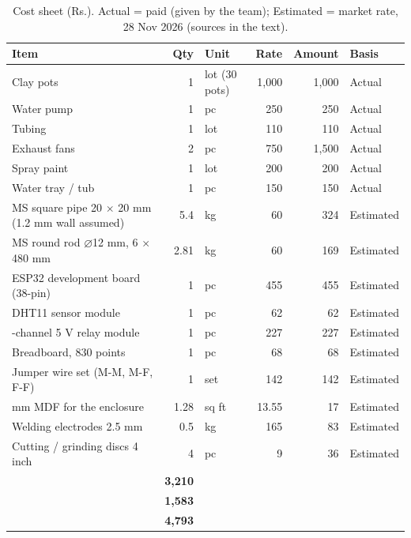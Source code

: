 \documentclass[11pt,a4paper]{report}
\begin{document}
\begin{table}[H]
\centering
\caption{Cost sheet (Rs.). Actual = paid (given by the team); Estimated = market rate, 28 Nov 2026 (sources in the text).}
\label{tab:cost}
\small
\begin{tabularx}{\linewidth}{@{}>{\raggedright\arraybackslash}Xrlrrl@{}}
\toprule
\textbf{Item} & \textbf{Qty} & \textbf{Unit} & \textbf{Rate} & \textbf{Amount} & \textbf{Basis} \\
\midrule
Clay pots & 1 & lot (30 pots) & 1,000 & 1{,}000 & Actual \\
Water pump & 1 & pc & 250 & 250 & Actual \\
Tubing & 1 & lot & 110 & 110 & Actual \\
Exhaust fans & 2 & pc & 750 & 1{,}500 & Actual \\
Spray paint & 1 & lot & 200 & 200 & Actual \\
Water tray / tub & 1 & pc & 150 & 150 & Actual \\
MS square pipe 20 $\times$ 20 mm (1.2 mm wall assumed) & 5.4 & kg & 60 & 324 & Estimated \\
MS round rod $\varnothing$12 mm, 6 $\times$ 480 mm & 2.81 & kg & 60 & 169 & Estimated \\
ESP32 development board (38-pin) & 1 & pc & 455 & 455 & Estimated \\
DHT11 sensor module & 1 & pc & 62 & 62 & Estimated \\
3-channel 5 V relay module & 1 & pc & 227 & 227 & Estimated \\
Breadboard, 830 points & 1 & pc & 68 & 68 & Estimated \\
Jumper wire set (M-M, M-F, F-F) & 1 & set & 142 & 142 & Estimated \\
3 mm MDF for the enclosure & 1.28 & sq ft & 13.55 & 17 & Estimated \\
Welding electrodes 2.5 mm & 0.5 & kg & 165 & 83 & Estimated \\
Cutting / grinding discs 4 inch & 4 & pc & 9 & 36 & Estimated \\
\midrule
\multicolumn{4}{@{}l}{\textbf{Actual subtotal}} & \textbf{3{,}210} & \\
\multicolumn{4}{@{}l}{\textbf{Estimated subtotal}} & \textbf{1{,}583} & \\
\multicolumn{4}{@{}l}{\textbf{Grand total}} & \textbf{4{,}793} & \\
\bottomrule
\end{tabularx}
\end{table}
\end{document}
